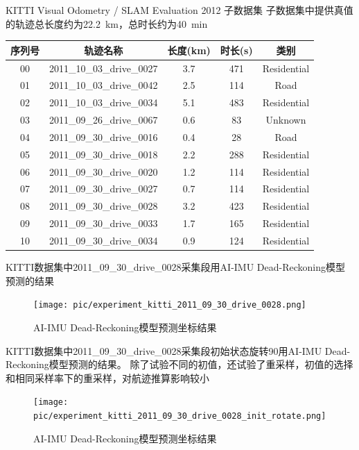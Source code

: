 \documentclass{beamer} %
\begin{document}
\begin{frame}{KITTI Visual Odometry / SLAM Evaluation 2012 子数据集}
    子数据集中提供真值的轨迹总长度约为\qty{22.2}{\km}，总时长约为\qty{40}{\minute}
    \begin{table}
        \tiny
        \begin{tabular}{ccccc}
            \toprule
            序列号 & 轨迹名称 & 长度(\unit{\km}) & 时长(\unit{\s}) & 类别 \\
            \midrule
            00 & 2011\_10\_03\_drive\_0027 & 3.7 & 471 & Residential \\
            01 & 2011\_10\_03\_drive\_0042 & 2.5 & 114 & Road \\
            02 & 2011\_10\_03\_drive\_0034 & 5.1 & 483 & Residential \\
            03 & 2011\_09\_26\_drive\_0067 & 0.6 & 83  & Unknown  \\
            04 & 2011\_09\_30\_drive\_0016 & 0.4 & 28  & Road \\
            05 & 2011\_09\_30\_drive\_0018 & 2.2 & 288 & Residential \\
            06 & 2011\_09\_30\_drive\_0020 & 1.2 & 114 & Residential \\
            07 & 2011\_09\_30\_drive\_0027 & 0.7 & 114 & Residential \\
            08 & 2011\_09\_30\_drive\_0028 & 3.2 & 423 & Residential \\
            09 & 2011\_09\_30\_drive\_0033 & 1.7 & 165 & Residential \\
            10 & 2011\_09\_30\_drive\_0034 & 0.9 & 124 & Residential \\
            \bottomrule
        \end{tabular}
    \end{table}
\end{frame}

\begin{frame}
    KITTI数据集中2011\_09\_30\_drive\_0028采集段用AI-IMU Dead-Reckoning模型预测的结果
    \begin{figure}[htbp]
        \centering
        \texttt{[image: pic/experiment\_kitti\_2011\_09\_30\_drive\_0028.png]}
        \caption{AI-IMU Dead-Reckoning模型预测坐标结果}
    \end{figure}
\end{frame}

\begin{frame}
     KITTI数据集中2011\_09\_30\_drive\_0028采集段初始状态旋转90用AI-IMU Dead-Reckoning模型预测的结果。 除了试验不同的初值，还试验了重采样，初值的选择和相同采样率下的重采样，对航迹推算影响较小
    \begin{figure}[htbp]
        \centering
        \texttt{[image: pic/experiment\_kitti\_2011\_09\_30\_drive\_0028\_init\_rotate.png]}
        \caption{AI-IMU Dead-Reckoning模型预测坐标结果}
    \end{figure}
\end{frame}
\end{document}
